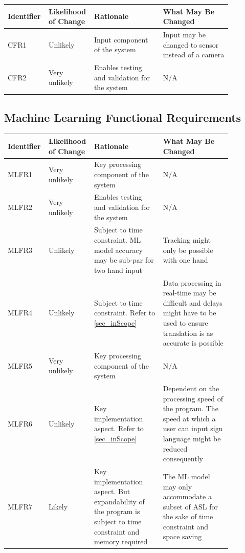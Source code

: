 \documentclass[12pt]{article}
\begin{document}
\renewcommand{\arraystretch}{1.2}
\noindent \begin{tabularx}{\textwidth}{p{0.12\linewidth}|p{0.15\linewidth}|p{0.3\linewidth}|p{0.3\linewidth}}
\toprule
\textbf{Identifier} & \textbf{Likelihood of Change} & \textbf{Rationale} & \textbf{What May Be Changed}\\
\midrule
CFR1 
& Unlikely
& Input component of the system
& Input may be changed to sensor instead of a camera\\
\hline
CFR2
& Very unlikely
& Enables testing and validation for the system
& N/A\\
\bottomrule
\end{tabularx}

\subsection{Machine Learning Functional Requirements}

\renewcommand{\arraystretch}{1.2}
\noindent \begin{tabularx}{\textwidth}{p{0.12\linewidth}|p{0.15\linewidth}|p{0.3\linewidth}|p{0.3\linewidth}}
\toprule
\textbf{Identifier} & \textbf{Likelihood of Change} & \textbf{Rationale} & \textbf{What May Be Changed}\\
\midrule
MLFR1 
& Very unlikely
& Key processing component of the system
& N/A\\
\hline
MLFR2 
& Very unlikely
& Enables testing and validation for the system
& N/A\\
\hline
MLFR3 
& Unlikely
& Subject to time constraint. ML model accuracy may be sub-par for two hand input
& Tracking might only be possible with one hand\\
\hline
MLFR4 
& Unlikely
& Subject to time constraint. Refer to \ref{sec_inScope}
& Data processing in real-time may be difficult and delays might have to be used to ensure translation is as accurate is possible\\
\hline
MLFR5 
& Very unlikely
& Key processing component of the system
& N/A\\
\hline
MLFR6 
& Unlikely
& Key implementation aspect. Refer to \ref{sec_inScope}
& Dependent on the processing speed of the program. The speed at which a user can input sign language might be reduced consequently\\
\hline
MLFR7 
& Likely
& Key implementation aspect. But expandability of the program is subject to time constraint and memory required
& The ML model may only accommodate a subset of ASL for the sake of time constraint and space saving\\
\bottomrule
\end{tabularx}
\end{document}
